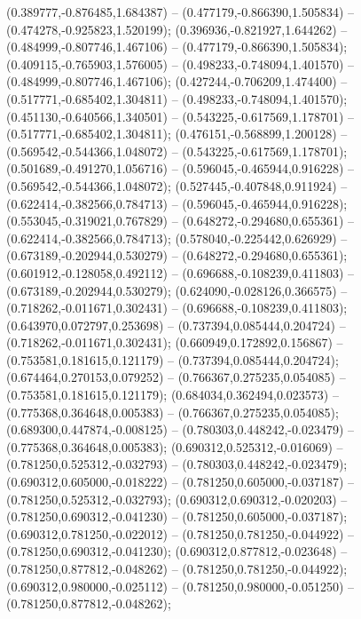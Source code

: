  (0.389777,-0.876485,1.684387) -- (0.477179,-0.866390,1.505834) -- (0.474278,-0.925823,1.520199);
 (0.396936,-0.821927,1.644262) -- (0.484999,-0.807746,1.467106) -- (0.477179,-0.866390,1.505834);
 (0.409115,-0.765903,1.576005) -- (0.498233,-0.748094,1.401570) -- (0.484999,-0.807746,1.467106);
 (0.427244,-0.706209,1.474400) -- (0.517771,-0.685402,1.304811) -- (0.498233,-0.748094,1.401570);
 (0.451130,-0.640566,1.340501) -- (0.543225,-0.617569,1.178701) -- (0.517771,-0.685402,1.304811);
 (0.476151,-0.568899,1.200128) -- (0.569542,-0.544366,1.048072) -- (0.543225,-0.617569,1.178701);
 (0.501689,-0.491270,1.056716) -- (0.596045,-0.465944,0.916228) -- (0.569542,-0.544366,1.048072);
 (0.527445,-0.407848,0.911924) -- (0.622414,-0.382566,0.784713) -- (0.596045,-0.465944,0.916228);
 (0.553045,-0.319021,0.767829) -- (0.648272,-0.294680,0.655361) -- (0.622414,-0.382566,0.784713);
 (0.578040,-0.225442,0.626929) -- (0.673189,-0.202944,0.530279) -- (0.648272,-0.294680,0.655361);
 (0.601912,-0.128058,0.492112) -- (0.696688,-0.108239,0.411803) -- (0.673189,-0.202944,0.530279);
 (0.624090,-0.028126,0.366575) -- (0.718262,-0.011671,0.302431) -- (0.696688,-0.108239,0.411803);
 (0.643970,0.072797,0.253698) -- (0.737394,0.085444,0.204724) -- (0.718262,-0.011671,0.302431);
 (0.660949,0.172892,0.156867) -- (0.753581,0.181615,0.121179) -- (0.737394,0.085444,0.204724);
 (0.674464,0.270153,0.079252) -- (0.766367,0.275235,0.054085) -- (0.753581,0.181615,0.121179);
 (0.684034,0.362494,0.023573) -- (0.775368,0.364648,0.005383) -- (0.766367,0.275235,0.054085);
 (0.689300,0.447874,-0.008125) -- (0.780303,0.448242,-0.023479) -- (0.775368,0.364648,0.005383);
 (0.690312,0.525312,-0.016069) -- (0.781250,0.525312,-0.032793) -- (0.780303,0.448242,-0.023479);
 (0.690312,0.605000,-0.018222) -- (0.781250,0.605000,-0.037187) -- (0.781250,0.525312,-0.032793);
 (0.690312,0.690312,-0.020203) -- (0.781250,0.690312,-0.041230) -- (0.781250,0.605000,-0.037187);
 (0.690312,0.781250,-0.022012) -- (0.781250,0.781250,-0.044922) -- (0.781250,0.690312,-0.041230);
 (0.690312,0.877812,-0.023648) -- (0.781250,0.877812,-0.048262) -- (0.781250,0.781250,-0.044922);
 (0.690312,0.980000,-0.025112) -- (0.781250,0.980000,-0.051250) -- (0.781250,0.877812,-0.048262);
